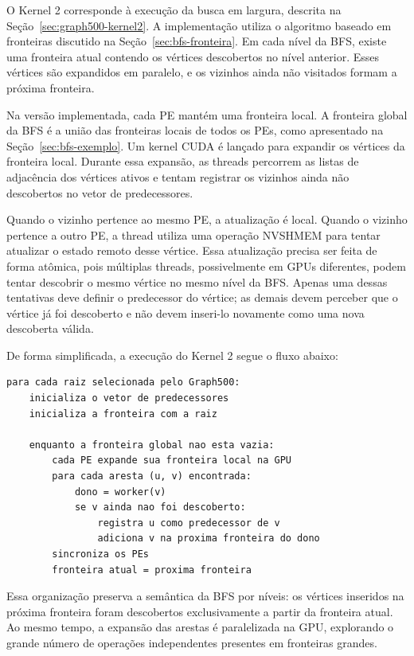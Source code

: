O Kernel 2 corresponde à execução da busca em largura, descrita na
Seção~\ref{sec:graph500-kernel2}. A implementação utiliza o algoritmo baseado em
fronteiras discutido na Seção~\ref{sec:bfs-fronteira}. Em cada nível da BFS,
existe uma fronteira atual contendo os vértices descobertos no nível anterior.
Esses vértices são expandidos em paralelo, e os vizinhos ainda não visitados
formam a próxima fronteira.

Na versão implementada, cada PE mantém uma fronteira local. A fronteira global da
BFS é a união das fronteiras locais de todos os PEs, como apresentado na
Seção~\ref{sec:bfs-exemplo}. Um kernel CUDA é lançado para expandir os vértices
da fronteira local. Durante essa expansão, as threads percorrem as listas de
adjacência dos vértices ativos e tentam registrar os vizinhos ainda não
descobertos no vetor de predecessores.

Quando o vizinho pertence ao mesmo PE, a atualização é local. Quando o vizinho
pertence a outro PE, a thread utiliza uma operação NVSHMEM para tentar atualizar
o estado remoto desse vértice. Essa atualização precisa ser feita de forma
atômica, pois múltiplas threads, possivelmente em GPUs diferentes, podem tentar
descobrir o mesmo vértice no mesmo nível da BFS. Apenas uma dessas tentativas
deve definir o predecessor do vértice; as demais devem perceber que o vértice já
foi descoberto e não devem inseri-lo novamente como uma nova descoberta válida.

De forma simplificada, a execução do Kernel 2 segue o fluxo abaixo:

\begin{lstlisting}
para cada raiz selecionada pelo Graph500:
    inicializa o vetor de predecessores
    inicializa a fronteira com a raiz

    enquanto a fronteira global nao esta vazia:
        cada PE expande sua fronteira local na GPU
        para cada aresta (u, v) encontrada:
            dono = worker(v)
            se v ainda nao foi descoberto:
                registra u como predecessor de v
                adiciona v na proxima fronteira do dono
        sincroniza os PEs
        fronteira atual = proxima fronteira
\end{lstlisting}

Essa organização preserva a semântica da BFS por níveis: os vértices inseridos na
próxima fronteira foram descobertos exclusivamente a partir da fronteira atual.
Ao mesmo tempo, a expansão das arestas é paralelizada na GPU, explorando o grande
número de operações independentes presentes em fronteiras grandes.

